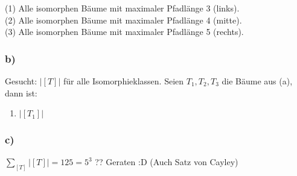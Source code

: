 \documentclass[11pt,a4paper,ngerman]{article}
\begin{document}
(1) Alle isomorphen Bäume mit maximaler Pfadlänge 3 (links).\\
(2) Alle isomorphen Bäume mit maximaler Pfadlänge 4 (mitte).\\
(3) Alle isomorphen Bäume mit maximaler Pfadlänge 5 (rechts).
\subsubsection*{b)}
Gesucht: $|[T]|$ für alle Isomorphieklassen.
Seien $T_1, T_2, T_3$ die Bäume aus (a), dann ist:
\begin{enumerate}
\item $|[T_1]|$ 
\end{enumerate}
\subsubsection*{c)}

$\sum_{[T]} |[T]| = 125 = 5^3$ ?? Geraten :D
(Auch Satz von Cayley)

\label{LastPage}
\end{document}
